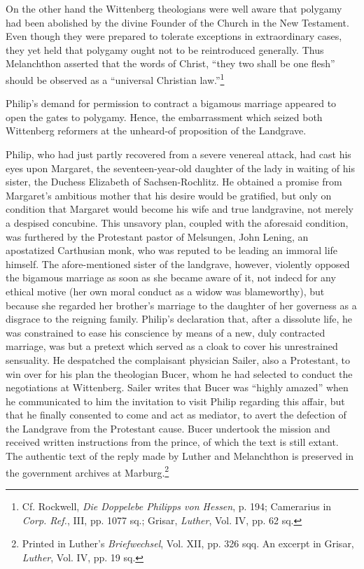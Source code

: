 On the other hand the Wittenberg theologians were well aware
that polygamy had been abolished by the divine Founder of the
Church in the New Testament. Even though they were prepared to
tolerate exceptions in extraordinary cases, they yet held that polygamy
ought not to be reintroduced generally. Thus Melanchthon asserted
that the words of Christ, “they two shall be one flesh” should
be observed as a “universal Christian law.”\footnote
{Cf. Rockwell, \textit{Die Doppelebe Philipps von Hessen}, p. 194; Camerarius in \textit{Corp. Ref.},
III, pp. 1077 sq.; Grisar, \textit{Luther}, Vol. IV, pp. 62 sq.}

Philip’s demand for permission to contract a bigamous marriage
appeared to open the gates to polygamy. Hence, the embarrassment
which seized both Wittenberg reformers at the unheard-of proposition of
the Landgrave.

Philip, who had just partly recovered from a severe venereal attack, had
cast his eyes upon Margaret, the seventeen-year-old
daughter of the lady in waiting of his sister, the Duchess Elizabeth
of Sachsen-Rochlitz. He obtained a promise from Margaret’s ambitious mother
that his desire would be gratified, but only on condition
that Margaret would become his wife and true landgravine, not
merely a despised concubine. This unsavory plan, coupled with the
aforesaid condition, was furthered by the Protestant pastor of Melsungen,
John Lening, an apostatized Carthusian monk, who was
reputed to be leading an immoral life himself. The afore-mentioned
sister of the landgrave, however, violently opposed the bigamous
marriage as soon as she became aware of it, not indecd for any ethical
motive (her own moral conduct as a widow was blameworthy), but
because she regarded her brother’s marriage to the daughter of her
governess as a disgrace to the reigning family. Philip’s declaration
that, after a dissolute life, he was constrained to ease his conscience by
means of a new, duly contracted marriage, was but a pretext which
served as a cloak to cover his unrestrained sensuality. He despatched
the complaisant physician Sailer, also a Protestant, to win over for
his plan the theologian Bucer, whom he had selected to conduct the
negotiations at Wittenberg. Sailer writes that Bucer was “highly
amazed” when he communicated to him the invitation to visit Philip
regarding this affair, but that he finally consented to come and act
as mediator, to avert the defection of the Landgrave from the Protestant
cause. Bucer undertook the mission and received written instructions
from the prince, of which the text is still extant. The authentic
text of the reply made by Luther and Melanchthon is preserved in
the government archives at Marburg.\footnote
{Printed in Luther’s \textit{Briefwechsel}, Vol. XII, pp. 326 sqq. An excerpt in Grisar, \textit{Luther},
Vol. IV, pp. 19 sq.}

